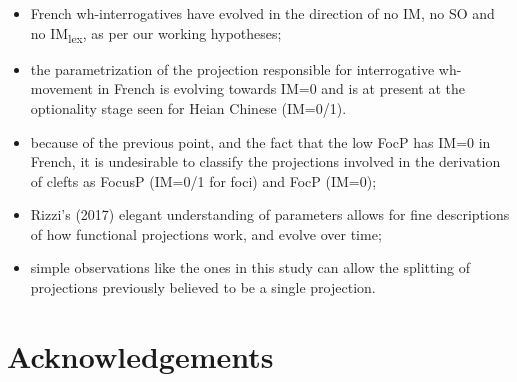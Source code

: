 \documentclass[fleqn,10pt]{wlscirep}
\begin{document}
\begin{itemize}
\item[\ding{227}] French wh-interrogatives have evolved in the direction of no IM, no SO and no IM\textsubscript{lex}, as per our working hypotheses;
\item[\ding{227}] \vspace*{-2mm} the parametrization of the projection responsible for interrogative wh-movement in French is evolving towards IM=0 and is at present at the optionality stage seen for Heian Chinese (IM=0/1).
\item[\ding{227}] \vspace*{-2mm} because of the previous point, and the fact that the low FocP has IM=0 in French, it is undesirable to classify the projections involved in the derivation of clefts as FocusP (IM=0/1 for foci) and FocP (IM=0);
\item[\ding{227}] \vspace*{-2mm} Rizzi's (2017) elegant understanding of parameters allows for fine descriptions of how functional projections work, and evolve over time;
\item[\ding{227}] \vspace*{-2mm} simple observations like the ones in this study can allow the splitting of projections previously believed to be a single projection.
\end{itemize}



\section*{Acknowledgements}
\end{document}
